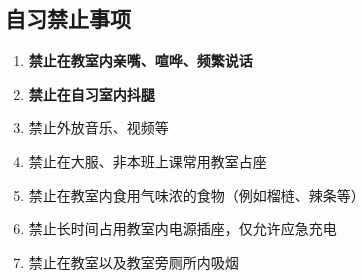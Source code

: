 \subsection[自习禁止事项]{自习禁止事项}
\begin{enumerate}
    \item \textbf{禁止在教室内亲嘴、喧哗、频繁说话}
    \item \textbf{禁止在自习室内抖腿}
    \item 禁止外放音乐、视频等
    \item 禁止在大服、非本班上课常用教室占座
    \item 禁止在教室内食用气味浓的食物（例如榴梿、辣条等）
    \item 禁止长时间占用教室内电源插座，仅允许应急充电
    \item 禁止在教室以及教室旁厕所内吸烟
\end{enumerate}

